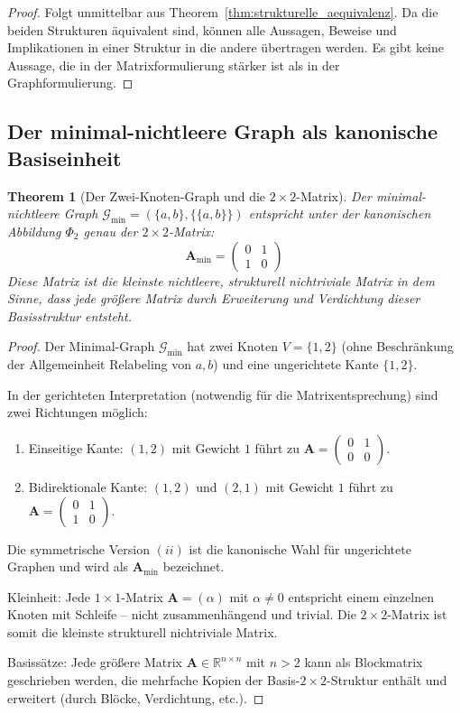 \documentclass[12pt, a4paper]{article}
\newtheorem{theorem}{Theorem}[section]
\theoremstyle{definition}
\theoremstyle{remark}
\newcommand{\R}{\mathbb{R}}
\newcommand{\vA}{\bm{A}}
\newcommand{\Graph}{\mathcal{G}}
\begin{document}
\begin{proof}
Folgt unmittelbar aus Theorem~\ref{thm:strukturelle_aequivalenz}. Da die beiden Strukturen äquivalent sind, können alle Aussagen, Beweise und Implikationen in einer Struktur in die andere übertragen werden. Es gibt keine Aussage, die in der Matrixformulierung stärker ist als in der Graphformulierung.
\end{proof}

\subsection{Der minimal-nichtleere Graph als kanonische Basiseinheit}
\label{subsec:minimal_basis}

\begin{theorem}[Der Zwei-Knoten-Graph und die $2 \times 2$-Matrix]
\label{thm:minimal_matrix}
Der minimal-nichtleere Graph $\Graph_{\min} = (\{a, b\}, \{\{a, b\}\})$ entspricht unter der kanonischen Abbildung $\Phi_2$ genau der $2 \times 2$-Matrix:
\[
  \vA_{\min} = \begin{pmatrix} 0 & 1 \\ 1 & 0 \end{pmatrix}
\]
Diese Matrix ist die \emph{kleinste} nichtleere, strukturell nichtriviale Matrix in dem Sinne, dass jede größere Matrix durch Erweiterung und Verdichtung dieser Basisstruktur entsteht.
\end{theorem}

\begin{proof}
Der Minimal-Graph $\Graph_{\min}$ hat zwei Knoten $V = \{1, 2\}$ (ohne Beschränkung der Allgemeinheit Relabeling von $a, b$) und eine ungerichtete Kante $\{1, 2\}$.

In der gerichteten Interpretation (notwendig für die Matrixentsprechung) sind zwei Richtungen möglich:
\begin{enumerate}[label=(\roman*)]
  \item Einseitige Kante: $(1, 2)$ mit Gewicht $1$ führt zu $\vA = \begin{pmatrix} 0 & 1 \\ 0 & 0 \end{pmatrix}$.
  \item Bidirektionale Kante: $(1, 2)$ und $(2, 1)$ mit Gewicht $1$ führt zu $\vA = \begin{pmatrix} 0 & 1 \\ 1 & 0 \end{pmatrix}$.
\end{enumerate}

Die symmetrische Version $(ii)$ ist die kanonische Wahl für ungerichtete Graphen und wird als $\vA_{\min}$ bezeichnet.

Kleinheit: Jede $1 \times 1$-Matrix $\vA = (\alpha)$ mit $\alpha \neq 0$ entspricht einem einzelnen Knoten mit Schleife -- nicht zusammenhängend und trivial. Die $2 \times 2$-Matrix ist somit die kleinste strukturell nichtriviale Matrix.

Basissätze: Jede größere Matrix $\vA \in \R^{n \times n}$ mit $n > 2$ kann als Blockmatrix geschrieben werden, die mehrfache Kopien der Basis-$2 \times 2$-Struktur enthält und erweitert (durch Blöcke, Verdichtung, etc.).
\end{proof}
\end{document}
